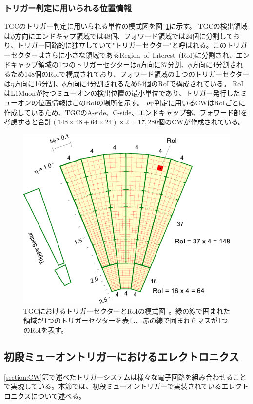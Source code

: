 \subsubsection{トリガー判定に用いられる位置情報}
TGCのトリガー判定に用いられる単位の模式図を図~\ref{fig:RoI}に示す。
TGCの検出領域は$\phi$方向にエンドキャプ領域では48個、フォワード領域では24個に分割しており、トリガー回路的に独立していて"トリガーセクター"と呼ばれる。このトリガーセクターはさらに小さな領域であるRegion~of~Interest~(RoI)に分割され、エンドキャップ領域の1つのトリガーセクターは$\eta$方向に37分割、$\phi$方向に4分割されるため148個のRoIで構成されており、フォワード領域の１つのトリガーセクターは$\eta$方向に16分割、$\phi$方向に4分割されるため64個のRoIで構成されている。
RoIはL1Muonが持つミューオンの検出位置の最小単位であり、トリガー発行したミューオンの位置情報はこのRoIの場所を示す。
$p_{\rm{T}}$判定に用いるCWはRoIごとに作成しているため、TGCのA-side、C-side、エンドキャップ部、フォワード部を考慮すると合計$(148\times48+64\times24)\times2=17,280$個のCWが作成されている。

\begin{figure}[tb]
  \centering
  \includegraphics[clip, width=12cm]{fig/3/RoI.pdf}
  \caption{TGCにおけるトリガーセクターとRoIの模式図~\cite{article:phase1}。緑の線で囲まれた領域が1つのトリガーセクターを表し、赤の線で囲まれたマスが1つのRoIを表す。}
  \label{fig:RoI}
\end{figure}



\newpage
\subsection{初段ミューオントリガーにおけるエレクトロニクス}
\ref{section:CW}節で述べたトリガーシステムは様々な電子回路を組み合わせることで実現している。本節では、初段ミューオントリガーで実装されているエレクトロニクスについて述べる。

